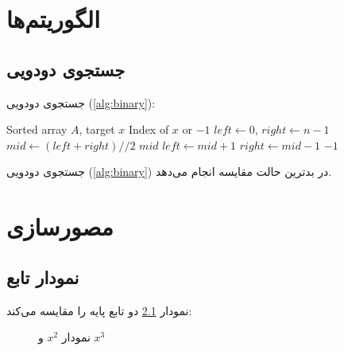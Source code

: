 \documentclass{matinbook}
\begin{document}
\chapter{الگوریتم‌ها}
\label{chap:algorithms}

\section{جستجوی دودویی}
\label{sec:algorithms-binary}

جستجوی دودویی (\cref{alg:binary}):

\begin{latin}
\begin{algorithm}
\caption{جستجوی دودویی}
\label{alg:binary}
\begin{algorithmic}[1]
    \Require Sorted array $A$, target $x$
    \Ensure Index of $x$ or $-1$
    \State $left \gets 0$, $right \gets n-1$
        \State $mid \gets (left + right) // 2$
            \State \Return $mid$
            \State $left \gets mid + 1$
        \Else
            \State $right \gets mid - 1$
        \EndIf
    \EndWhile
    \State \Return $-1$
\end{algorithmic}
\end{algorithm}
\end{latin}

\begin{theorem}
    جستجوی دودویی (\cref{alg:binary}) در بدترین حالت
     مقایسه انجام می‌دهد.
    \label{thm:binary}
\end{theorem}

\chapter{مصورسازی}
\label{chap:visualization}

\section{نمودار تابع}
\label{sec:visualization-plot}

نمودار \cref{fig:functions} دو تابع پایه را مقایسه
می‌کند:

\begin{figure}[h]
\centering
\begin{latin}
\end{latin}
\caption{نمودار $x^{2}$ و $x^{3}$}
\label{fig:functions}
\end{figure}
\end{document}
